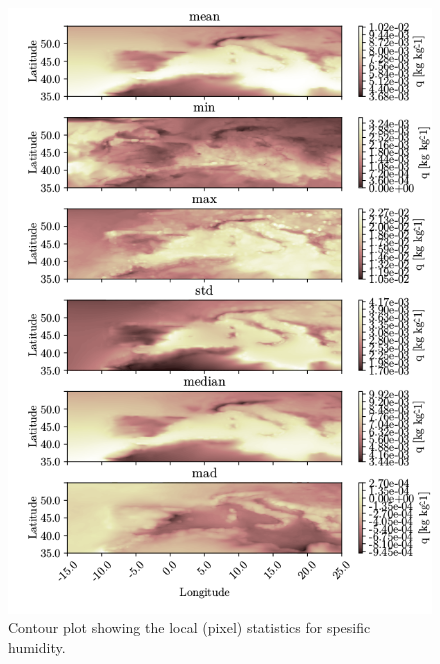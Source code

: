 \begin{figure}[ht]
    \centering
    \includegraphics{python_figs/all_stat_variable_q.png}
    \caption{Contour plot showing the local (pixel) statistics for spesific humidity.}
    \label{fig:all_stats_q}
\end{figure}


